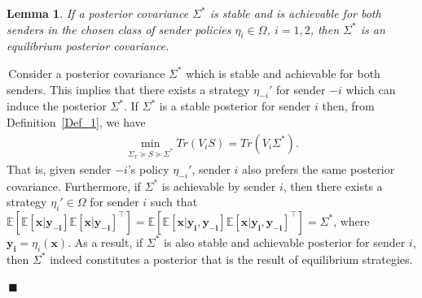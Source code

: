 \documentclass[12pt,journal,onecolumn]{IEEEtran}
\newtheorem{lemma}{Lemma}
\newenvironment{Proof}[1]{\medskip\par\noindent{\bf Proof:\,}\,#1}{{\mbox{\,$\blacksquare$}\par}}
\newcommand{\rknote}[1]{\noindent{\leavevmode\color{red}[Raj -- #1]}}
\newcommand{\mbedit}[1]{{\color{green1}#1}}
\begin{document}
\begin{lemma}\label{lem: stabsig}
If a posterior covariance $\Sigma^*$ is stable and is achievable for both senders in the chosen class of sender policies ${\eta_i}\in\Omega$, $i=1,2$, then $\Sigma^*$ is an equilibrium posterior covariance. %
\end{lemma}
\begin{Proof}
Consider a posterior covariance $\Sigma^*$ which is stable and achievable for both senders. This implies that there exists a strategy $\eta_{-i}'$ for sender $-i$ which can induce the posterior $\Sigma^*$. If $\Sigma^*$ is a stable posterior for sender $i$ then, from Definition~\ref{Def_1}, we have
\begin{align*}
    \min_{\Sigma_x\succeq S\succeq\Sigma^*} Tr(V_iS)=Tr(V_i\Sigma^*).
\end{align*}
That is, given sender $-i$'s policy  $\eta_{-i}'$, sender $i$ also prefers the same posterior covariance. %
Furthermore, if $\Sigma^*$ is achievable by sender $i$, then there exists a strategy $\eta_i'\in\Omega$ for sender $i$ such that $\mathbb{E}[\mathbb{E}[\boldsymbol{x}|\boldsymbol{y_{-i}}]\mathbb{E}[\boldsymbol{x}|\boldsymbol{y_{-i}}]^\top]=\mathbb{E}[\mathbb{E}[\boldsymbol{x}|\boldsymbol{y_i},\boldsymbol{y_{-i}}]\mathbb{E}[\boldsymbol{x}|\boldsymbol{y_i},\boldsymbol{y_{-i}}]^\top]=\Sigma^*$, where $\boldsymbol{y_i}=\eta_i(\boldsymbol{x})$.
As a result, if $\Sigma^*$ is also stable and achievable posterior for sender $i$, then $\Sigma^*$ indeed constitutes a posterior that is the result of equilibrium strategies.
\end{Proof}
\end{document}
